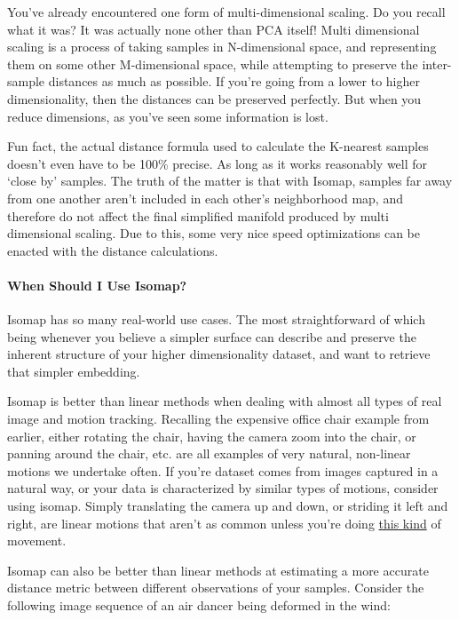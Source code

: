 \documentclass[11pt]{article}
\begin{document}
You've already encountered one form of multi-dimensional scaling. Do you
recall what it was? It was actually none other than PCA itself! Multi
dimensional scaling is a process of taking samples in N-dimensional
space, and representing them on some other M-dimensional space, while
attempting to preserve the inter-sample distances as much as possible.
If you're going from a lower to higher dimensionality, then the
distances can be preserved perfectly. But when you reduce dimensions, as
you've seen some information is lost.

Fun fact, the actual distance formula used to calculate the K-nearest
samples doesn't even have to be 100\% precise. As long as it works
reasonably well for `close by' samples. The truth of the matter is that
with Isomap, samples far away from one another aren't included in each
other's neighborhood map, and therefore do not affect the final
simplified manifold produced by multi dimensional scaling. Due to this,
some very nice speed optimizations can be enacted with the distance
calculations.

\hypertarget{when-should-i-use-isomap}{%
\paragraph{When Should I Use Isomap?}\label{when-should-i-use-isomap}}

Isomap has so many real-world use cases. The most straightforward of
which being whenever you believe a simpler surface can describe and
preserve the inherent structure of your higher dimensionality dataset,
and want to retrieve that simpler embedding.

Isomap is better than linear methods when dealing with almost all types
of real image and motion tracking. Recalling the expensive office chair
example from earlier, either rotating the chair, having the camera zoom
into the chair, or panning around the chair, etc. are all examples of
very natural, non-linear motions we undertake often. If you're dataset
comes from images captured in a natural way, or your data is
characterized by similar types of motions, consider using isomap. Simply
translating the camera up and down, or striding it left and right, are
linear motions that aren't as common unless you're doing
\href{https://www.youtube.com/watch?v=x4eLsRUbtBk}{this kind} of
movement.

Isomap can also be better than linear methods at estimating a more
accurate distance metric between different observations of your samples.
Consider the following image sequence of an air dancer being deformed in
the wind:
\end{document}

